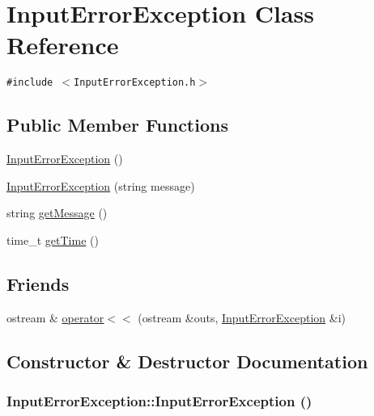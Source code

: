 \hypertarget{class_input_error_exception}{
\section{Input\-Error\-Exception Class Reference}
\label{class_input_error_exception}
}
{\tt \#include $<$Input\-Error\-Exception.h$>$}

\subsection*{Public Member Functions}
\begin{CompactItemize}
\item 
\hyperlink{class_input_error_exception_c01bc54826885ff57864d4ae44e99991}{Input\-Error\-Exception} ()
\item 
\hyperlink{class_input_error_exception_a5b055150d69a2f34306d7e593da629f}{Input\-Error\-Exception} (string message)
\item 
string \hyperlink{class_input_error_exception_d3115ba6a009eec3cfb9fdc7af4c7fdb}{get\-Message} ()
\item 
time\_\-t \hyperlink{class_input_error_exception_63b6711a881165ec2d91d06d02a6d6a6}{get\-Time} ()
\end{CompactItemize}
\subsection*{Friends}
\begin{CompactItemize}
\item 
ostream \& \hyperlink{class_input_error_exception_632247cf1d4273fe4755d4592fa85784}{operator$<$$<$} (ostream \&outs, \hyperlink{class_input_error_exception}{Input\-Error\-Exception} \&i)
\end{CompactItemize}


\subsection{Constructor \& Destructor Documentation}
\hypertarget{class_input_error_exception_c01bc54826885ff57864d4ae44e99991}{
\subsubsection[InputErrorException]{\setlength{\rightskip}{0pt plus 5cm}Input\-Error\-Exception::Input\-Error\-Exception ()}}
\label{class_input_error_exception_c01bc54826885ff57864d4ae44e99991}


